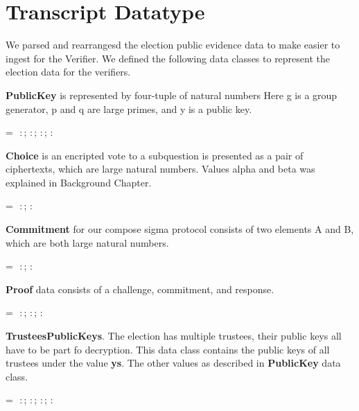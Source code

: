 \section{Transcript Datatype}
We parsed and rearrangesd the election public evidence data to make easier to ingest for the Verifier.
We defined the following data classes to represent the election data for the verifiers.

\textbf{PublicKey} is represented by four-tuple of natural numbers
Here g is a group generator, p and q are large primes, and y is a public key. \\

\begin{holmath}
     = \HOLTokenLeftrec{}\,\,:\,;\,\,:\,;\,\,:\,;\,\,:\,\,\HOLTokenRightrec{}
\end{holmath}  

\textbf{Choice} is an encripted vote to a subquestion is presented as a pair of ciphertexts, 
which are large natural numbers.
Values alpha and beta was explained in Background Chapter. \\
\begin{holmath}
     = \HOLTokenLeftrec{}\,\,:\,;\,\,:\,\,\HOLTokenRightrec{}
\end{holmath}  

\textbf{Commitment} for our compose sigma protocol consists of two elements A and B, 
which are both large natural numbers. \\
\begin{holmath}
     = \HOLTokenLeftrec{}\,\,:\,;\,\,:\,\,\HOLTokenRightrec{}
\end{holmath}  

\textbf{Proof} data consists of a challenge, commitment, and response. \\
\begin{holmath}
     = \HOLTokenLeftrec{}\,\,:\,;\,\,:\,;\,\,:\,\,\HOLTokenRightrec{}
\end{holmath}  

\textbf{TrusteesPublicKeys}. 
The election has multiple trustees, their public keys all have to be part fo decryption.
This data class contains the public keys of all trustees under the value \textbf{ys}.
The other values as described in \textbf{PublicKey} data class. \\
\begin{holmath}
     = \HOLTokenLeftrec{}\,\,:\,;\,\,:\,;\,\,:\,;\,\,:\,\,\,\HOLTokenRightrec{}
\end{holmath}  

